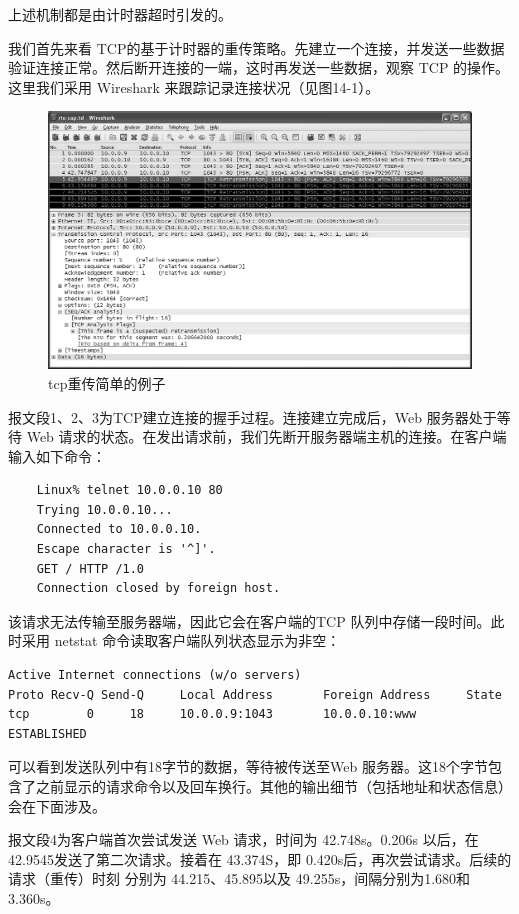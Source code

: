 上述机制都是由计时器超时引发的。

我们首先来看 TCP的基于计时器的重传策略。先建立一个连接，并发送一些数据验证连接正常。然后断开连接的一端，这时再发送一些数据，观察
TCP 的操作。这里我们采用
Wireshark 来跟踪记录连接状况（见图14-1）。

\begin{figure}[!htb]
  \includegraphics[width=1.0\textwidth]{imgs/14/14-1.png}
  \caption{tcp重传简单的例子}
\end{figure}

报文段1、2、3为TCP建立连接的握手过程。连接建立完成后，Web 服务器处于等待 Web
请求的状态。在发出请求前，我们先断开服务器端主机的连接。在客户端输入如下命令：
\begin{verbatim}
    Linux% telnet 10.0.0.10 80
    Trying 10.0.0.10...
    Connected to 10.0.0.10.
    Escape character is '^]'.
    GET / HTTP /1.0
    Connection closed by foreign host.
\end{verbatim}

该请求无法传输至服务器端，因此它会在客户端的TCP 队列中存储一段时间。此时采用 netstat 命令读取客户端队列状态显示为非空：

\begin{verbatim}
Active Internet connections (w/o servers)
Proto Recv-Q Send-Q     Local Address       Foreign Address     State
tcp        0     18     10.0.0.9:1043       10.0.0.10:www       ESTABLISHED
\end{verbatim}

可以看到发送队列中有18字节的数据，等待被传送至Web
服务器。这18个字节包含了之前显示的请求命令以及回车换行。其他的输出细节（包括地址和状态信息）会在下面涉及。

报文段4为客户端首次尝试发送 Web 请求，时间为 42.748s。0.206s 以后，在42.9545发送了第二次请求。接着在
43.374S，即 0.420s后，再次尝试请求。后续的请求（重传）时刻
分别为 44.215、45.895以及 49.255s，间隔分别为1.680和 3.360s。

